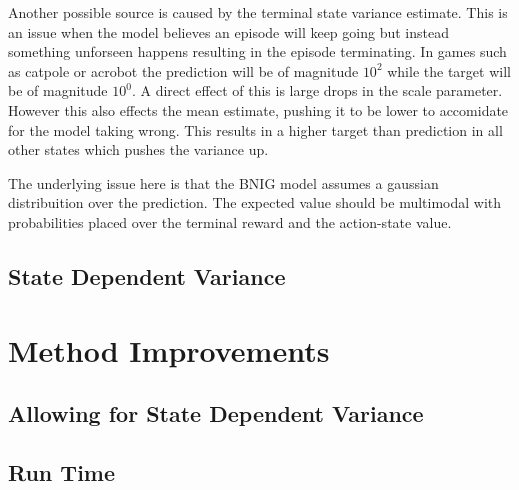 Another possible source is caused by the terminal state variance estimate. This is an issue when the model believes an episode will keep going but instead something unforseen happens resulting in the episode terminating. In games such as catpole or acrobot the prediction will be of magnitude $10^2$ while the target will be of magnitude $10^0$. A direct effect of this is large drops in the scale parameter. However this also effects the mean estimate, pushing it to be lower to accomidate for the model taking wrong. This results in a higher target than prediction in all other states which pushes the variance up.

The underlying issue here is that the BNIG model assumes a gaussian distribuition over the prediction. The expected value should be multimodal with probabilities placed over the terminal reward and the action-state value.

\subsection{State Dependent Variance}



\section{Method Improvements}

\subsection{Allowing for State Dependent Variance}

\subsection{Run Time}

\cleardoublepage